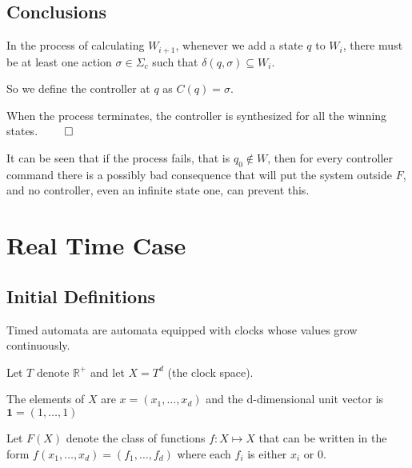 \documentclass[table]{beamer}
\begin{document}
\subsection{Conclusions}
\begin{frame}
	\justify
	In the process of calculating $W_{i+1}$, whenever we add a state $q$ to $W_i$, 
	there must be at least one action $\sigma \in \Sigma_c$ such that $\delta(q,\sigma) \subseteq W_i$.
	
	\medskip	
	
	So we define the controller at $q$ as $C(q)=\sigma$.
	
	\medskip
	
	When the process terminates, the controller is synthesized for all the winning states. $\qed$
		
	\medskip
	
	It can be seen that if the process fails, that is $q_0 \not\in W$, then for every controller
	command there is a possibly bad consequence that will put the system outside $F$, 
	and no controller, even an infinite state one, can prevent this.

\end{frame}

\section{Real Time Case}
\subsection{Initial Definitions}
\begin{frame}
	Timed automata are automata equipped with clocks whose values grow continuously.

	\medskip 

	Let $T$ denote $\mathbb{R}^+$ and let $X=T^d$ (the clock space).
	
	\medskip
	
	The elements of $X$ are $x=(x_1,\ldots,x_d)$ and the d-dimensional unit vector is $\textbf{1}=(1,\ldots,1)$ 
	
	\medskip
	
	\begin{dfn}
		Let $F(X)$ denote the class of functions $f:X \mapsto X$ that can be written in the form $f(x_1,\ldots,x_d)=(f_1,\ldots,f_d)$ where each $f_i$ is either $x_i$ or $0$.
	\end{dfn}
	
\end{frame}
\end{document}
